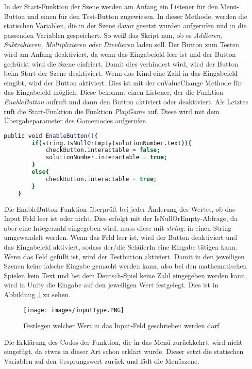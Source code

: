 In der Start-Funktion der Szene werden am Anfang ein Listener für den Menü-Button und einen für den Test-Button zugewiesen. In dieser Methode, werden die statischen Variablen, die in der Szene davor gesetzt wurden aufgerufen und in die passenden Variablen gespeichert.
So weiß das Skript nun, ob es \textit{Addieren, Subtrahieren, Multiplizieren oder Dividieren} laden soll. Der Button zum Testen wird am Anfang deaktiviert, da wenn das Eingabefeld leer ist und der Button gedrückt wird die Szene einfriert. Damit dies verhindert wird, wird der Button beim Start der Szene deaktiviert. Wenn das Kind eine Zahl in das Eingabefeld eingibt, wird der Button aktiviert. Dies ist mit der onValueChange Methode für das Eingabefeld möglich. Diese bekommt einen Listener, der die Funktion \textit{EnableButton} aufruft und dann den Button aktiviert oder deaktiviert. Als Letztes ruft die Start-Funktion die Funktion \textit{PlayGame} auf. Diese wird mit dem Übergabeparameter des Gamemodes aufgerufen.\\
\begin{lstlisting}[language=csh, caption={MathOperations.cs EnableButton-Funktion}]
	public void EnableButton(){
		if(string.IsNullOrEmpty(solutionNumber.text)){
			checkButton.interactable = false;
			solutionNumber.interactable = true;
		}
		else{
			checkButton.interactable = true;
		}
	}
\end{lstlisting}
Die EnableButton-Funktion überprüft bei jeder Änderung des Wertes, ob das Input Feld leer ist oder nicht. Dies erfolgt mit der IsNullOrEmpty-Abfrage, da aber eine Integerzahl eingegeben wird, muss diese mit \textit{string.} in einen String umgewandelt werden. Wenn das Feld leer ist, wird der Button deaktiviert und das Eingabefeld aktiviert, sodass der/die SchülerIn eine Eingabe tätigen kann. Wenn das Feld gefüllt ist, wird der Testbutton aktiviert. Damit in den jeweiligen Szenen keine falsche Eingabe gemacht werden kann, also bei den mathematischen Spielen kein Text und bei dem Deutsch-Spiel keine Zahl eingegeben werden kann, wird in Unity die Eingabe auf den jeweiligen Wert festgelegt. Dies ist in Abbildung \ref{inputField} zu sehen.
\begin{figure}[htbp]
  \centering
  \texttt{[image: images/inputType.PNG]}
  \caption{Festlegen welcher Wert in das Input-Feld geschrieben werden darf}
  \label{inputField}
\end{figure}
Die Erklärung des Codes der Funktion, die in das Menü zurückkehrt, wird nicht eingefügt, da etwas in dieser Art schon erklärt wurde. Dieser setzt die statischen Variablen auf den Ursprungswert zurück und lädt die Menüszene.\\
